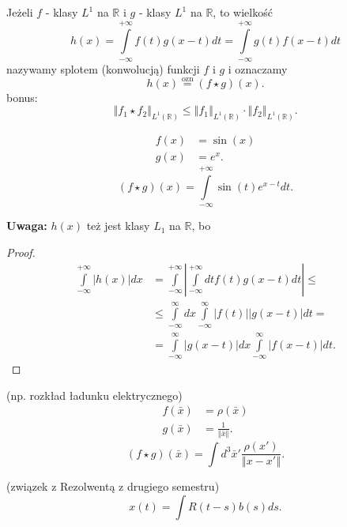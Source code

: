\documentclass[../main.tex]{subfiles}
\begin{document}
    \begin{definicja}
        Jeżeli $f$ - klasy $L^1$ na $\mathbb{R}$ i $g$ - klasy $L^1$ na $\mathbb{R}$, to wielkość
        \[
            h(x) = \int\limits_{-\infty}^{+\infty}f(t)g(x-t)dt = \int\limits_{-\infty}^{+\infty}g(t)f(x-t)dt
        \]
        nazywamy splotem (konwolucją) funkcji $f$ i $g$ i oznaczamy
        \[
            h(x) \overset{\text{ozn}}{=} \left( f \star g \right) (x)
        .\]
    bonus:
        \[
            \left\Vert f_1\star f_2 \right\Vert_{L^1(\mathbb{R})} \le \left\Vert f_1 \right\Vert_{L^1(\mathbb{R})} \cdot \left\Vert f_2 \right\Vert_{L^1(\mathbb{R})}
        .\]
    \end{definicja}
    \begin{przyklad}
        \begin{align*}
            f(x) &= \sin(x)\\
            g(x) &= e^x
        .\end{align*}
        \[
            \left( f\star g \right) (x) = \int\limits_{-\infty}^{+\infty}\sin(t)e^{x-t}dt
        .\]
    \end{przyklad}
    \textbf{Uwaga:} $h(x)$ też jest klasy $L_1$ na $\mathbb{R}$, bo
    \begin{proof}
        \begin{align*}
            \int\limits_{-\infty}^{+\infty}\left|  h(x) \right| dx &= \int\limits_{-\infty}^{+\infty}\left| \int\limits_{-\infty}^{+\infty}dt f(t) g(x-t)dt \right| \le \\
            &\le \int\limits_{-\infty}^{\infty} dx \int\limits_{-\infty}^{\infty} \left| f(t) \right| \left| g(x-t) \right| dt =\\
            &=\int\limits_{-\infty}^{\infty} \left| g(x-t) \right| dx \int\limits_{-\infty}^{\infty} \left| f(x-t) \right| dt
        .\end{align*}
    \end{proof}
    \begin{przyklad}
        (np. rozkład ładunku elektrycznego)
        \begin{align*}
            f(\bar{x}) &= \rho(\bar{x})\\
            g(\bar{x}) &= \frac{1}{\left\Vert \bar{x} \right\Vert }
        .\end{align*}
        \[
            \left( f\star g \right) (\bar{x}) = \int d^3 \bar{x}' \frac{\rho(x')}{\left\Vert x - x' \right\Vert }
        .\]
    \end{przyklad}
    \begin{przyklad}
        (związek z Rezolwentą z drugiego semestru)
        \[
            x(t) = \int R(t-s)b(s)ds
        .\]
    \end{przyklad}
\end{document}
